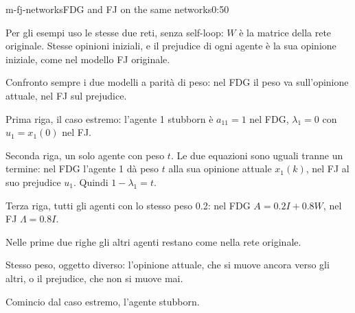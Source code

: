 
\begin{slide}{m-fj-networks}{FDG and FJ on the same networks}{0:50}
  \begin{discorso}
    \item Per gli esempi uso le stesse due reti, senza self-loop: $W$ è la matrice della rete originale. Stesse opinioni iniziali, e il prejudice di ogni agente è la sua opinione iniziale, come nel modello FJ originale.
    \item Confronto sempre i due modelli a parità di peso: nel FDG il peso va sull'opinione attuale, nel FJ sul prejudice.
    \item Prima riga, il caso estremo: l'agente 1 stubborn è $a_{11}=1$ nel FDG, $\lambda_1=0$ con $u_1=x_1(0)$ nel FJ.
    \item Seconda riga, un solo agente con peso $t$. Le due equazioni sono uguali tranne un termine: nel FDG l'agente 1 dà peso $t$ alla sua opinione attuale $x_1(k)$, nel FJ al suo prejudice $u_1$. Quindi $1-\lambda_1=t$.
    \item Terza riga, tutti gli agenti con lo stesso peso 0.2: nel FDG $A=0.2I+0.8W$, nel FJ $\Lambda=0.8I$.
    \item Nelle prime due righe gli altri agenti restano come nella rete originale.
    \item Stesso peso, oggetto diverso: l'opinione attuale, che si muove ancora verso gli altri, o il prejudice, che non si muove mai.
    \item Comincio dal caso estremo, l'agente stubborn.
  \end{discorso}
\end{slide}

